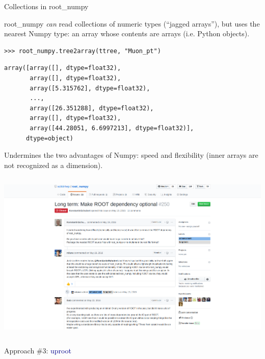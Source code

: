 \documentclass[aspectratio=169]{beamer}
\begin{document}
\begin{frame}[fragile]{Collections in root\_numpy}
\large
\vspace{0.5 cm}

root\_numpy {\it can} read collections of numeric types (``jagged arrays''), but uses the nearest Numpy type: an array whose contents are arrays (i.e. Python objects).

\small
\begin{verbatim}
>>> root_numpy.tree2array(ttree, "Muon_pt")
\end{verbatim}
\color{darkblue}\vspace{-\baselineskip}\begin{verbatim}
array([array([], dtype=float32),
       array([], dtype=float32),
       array([5.315762], dtype=float32),
       ...,
       array([26.351288], dtype=float32),
       array([], dtype=float32),
       array([44.28051, 6.6997213], dtype=float32)],
      dtype=object)
\end{verbatim}
\color{black}

\large
Undermines the two advantages of Numpy: speed and flexibility (inner arrays are not recognized as a dimension).
\end{frame}

\begin{frame}{}
\begin{columns}
\includegraphics[width=\linewidth]{root-numpy-optionalroot.png}
\end{columns}
\end{frame}

\begin{frame}{}
\LARGE
\begin{center}
Approach \#3: \textcolor{darkblue}{uproot}
\end{center}
\end{frame}
\end{document}
